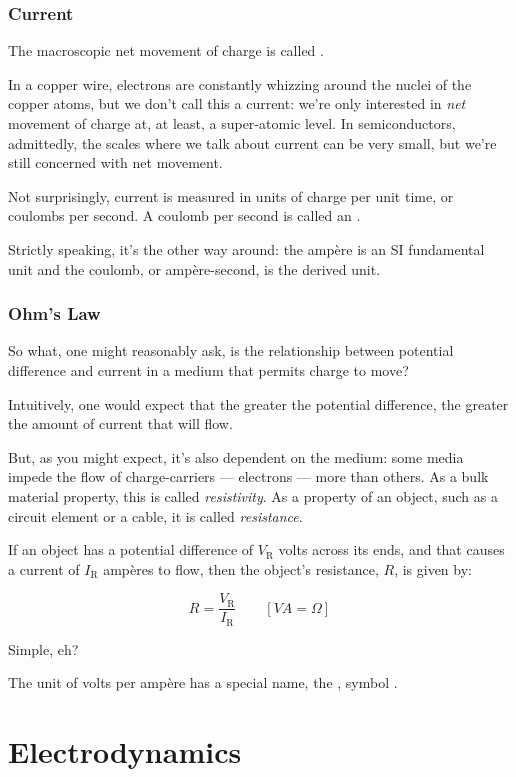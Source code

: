 \subsubsection{Current}

The macroscopic net movement of charge is called .

In a copper wire, electrons are constantly whizzing around the nuclei
of the copper atoms, but we don't call this a current: we're only
interested in \emph{net} movement of charge at, at least, a
super-atomic level. In semiconductors, admittedly, the scales where we
talk about current can be very small, but we're still concerned with
net movement.

Not surprisingly, current is measured in units of charge per unit
time, or coulombs per second. A coulomb per second is called an
.

Strictly speaking, it's the other way around: the amp\`ere is an SI
fundamental unit and the coulomb, or amp\`ere-second, is the derived
unit.

\subsubsection{Ohm's Law}

So what, one might reasonably ask, is the relationship between
potential difference and current in a medium that permits charge to
move?

Intuitively, one would expect that the greater the potential
difference, the greater the amount of current that will flow.

But, as you might expect, it's also dependent on the medium: some
media impede the flow of charge-carriers --- electrons --- more than
others. As a bulk material property, this is called
\emph{resistivity}. As a property of an object, such as a circuit
element or a cable, it is called \emph{resistance}.

If an object has a potential difference of $V_\mathrm{R}$ volts across
its ends, and that causes a current of $I_\mathrm{R}$ amp\`eres to
flow, then the object's resistance, $R$, is given by:

\begin{equation}
R = \frac{V_\mathrm{R}}{I_\mathrm{R}} \qquad\left[\unit{V}{A}=\unit{\Omega}\right]
\end{equation}

Simple, eh?

The unit of volts per amp\`ere has a special name, the ,
symbol \unit{\Omega}.


\section{Electrodynamics}

